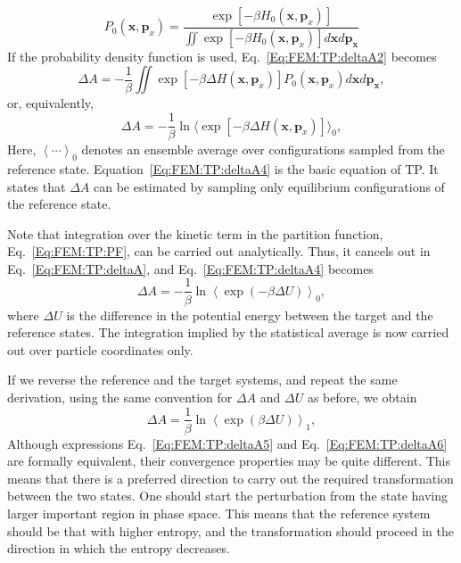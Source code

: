 \begin{equation}
P_{0}(\mathbf{x},\mathbf{p}_{x}) = \frac{ \exp[-\beta H_{0}(\mathbf{x},\mathbf{p}_{x}) ] }{\iint \exp[-\beta H_{0}(\mathbf{x},\mathbf{p}_{x}) ] d\mathbf{x}d\mathbf{p}_\mathbf{x}}
\label{Eq:FEM:TP:proden}
\end{equation}
If the probability density function is used, Eq.~\ref{Eq:FEM:TP:deltaA2} becomes
\begin{equation}
\Delta A = -\frac{1}{\beta} \iint \exp[-\beta \Delta H(\mathbf{x},\mathbf{p}_{x})] P_{0}(\mathbf{x},\mathbf{p}_{x}) d\mathbf{x}d\mathbf{p}_\mathbf{x},
\label{Eq:FEM:TP:deltaA3}
\end{equation}
or, equivalently,
\begin{equation}
\Delta A = -\frac{1}{\beta} \ln{\langle \exp{\left[-\beta \Delta H(\mathbf{x},\mathbf{p}_{x})\right]} \rangle_{0}},
\label{Eq:FEM:TP:deltaA4}
\end{equation}
Here, $\left \langle \cdots \right \rangle _{0}$ denotes an ensemble average over configurations sampled from the reference state. Equation~\ref{Eq:FEM:TP:deltaA4} is the basic equation of TP. It states that $\Delta A$ can be estimated by sampling only equilibrium configurations of the reference state.

Note that integration over the kinetic term in the partition function, Eq.~\ref{Eq:FEM:TP:PF}, can be carried out analytically. Thus, it cancels out in Eq.~\ref{Eq:FEM:TP:deltaA}, and Eq.~\ref{Eq:FEM:TP:deltaA4} becomes
\begin{equation}
\Delta A = -\frac{1}{\beta} \ln{\left< \exp(-\beta \Delta U) \right>_{0}},
\label{Eq:FEM:TP:deltaA5}
\end{equation}
where $\Delta U$ is the difference in the potential energy between the target and the reference states. The integration implied by the statistical average is now carried out over particle coordinates only.

If we reverse the reference and the target systems, and repeat the same derivation, using the same convention for  $\Delta A$ and $\Delta U$ as before, we obtain
\begin{equation}
\Delta A = \frac{1}{\beta} \ln{ \left \langle \exp(\beta \Delta U) \right \rangle_{1}},
\label{Eq:FEM:TP:deltaA6}
\end{equation}
Although expressions Eq.~\ref{Eq:FEM:TP:deltaA5} and Eq.~\ref{Eq:FEM:TP:deltaA6} are formally equivalent, their convergence properties may be quite different. This means that there is a preferred direction to carry out the required transformation between the two states. One should start the perturbation from the state having larger important region in phase space. This means that the reference system should be that with higher entropy, and the transformation should proceed in the direction in which the entropy decreases. 

